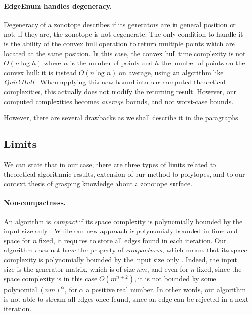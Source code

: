 \paragraph*{EdgeEnum handles degeneracy.} Degeneracy of a zonotope describes if its generators are in general position or not. If they are, the zonotope is not degenerate. The only condition to handle it is the ability of the convex hull operation to return multiple points which are located at the same position. In this case, the convex hull time complexity is not $O(n\log h)$ where $n$ is the number of points and $h$ the number of points on the convex hull: it is instead $O(n\log n)$ on average, using an algorithm like \emph{QuickHull} \cite{barberQuickhullAlgorithmConvex1996}. When applying this new bound into our computed theoretical complexities, this actually does not modify the returning result. However, our computed complexities becomes \emph{average} bounds, and not worst-case bounds. 

However, there are several drawbacks as we shall describe it in the paragraphs.

\subsection{Limits}
We can state that in our case, there are three types of limits related to theoretical algorithmic results, extension of our method to polytopes, and to our context thesis of grasping knowledge about a zonotope surface.

\paragraph*{Non-compactness.} An algorithm is \emph{compact} if its space complexity is polynomially bounded by the input size only \cite{fukudaZonotopeConstructionMinkowski2004a}.
While our new approach is polynomialy bounded in time and space for $n$ fixed, it requires to store all edges found in each iteration.
Our algorithm does not have the property of \emph{compactness}, which means that its space complexity is polynomially bounded by the input size only \cite{fukudaZonotopeConstructionMinkowski2004a}. Indeed, the input size is the generator matrix, which is of size $nm$, and even for $n$ fixed, since the space complexity is in this case $O(m^{n+2})$, it is not bounded by some polynomial $(nm)^{\alpha}$, for $\alpha$ a positive real number. In other words, our algorithm is not able to stream all edges once found, since an edge can be rejected in a next iteration.

